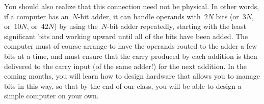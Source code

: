 You should also realize that this connection need not be physical.
In other words, if a computer has an~\mbox{$N$-bit} adder, it can
handle operands with~$2N$ bits (or~$3N$, or~$10N$, or~$42N$) by
using the~\mbox{$N$-bit} adder repeatedly, starting with the
least significant bits and working upward until all of the bits
have been added.  The computer must of course arrange to have the
operands routed to the adder a few bits at a time, and must
ensure that the carry produced by each addition is then delivered to
the carry input (of the same adder!) for the next addition.
In the coming months, you will learn how to design hardware that
allows you to manage bits in this way, so that by the end of our
class, you will be able to design a simple computer on your own.

\vfill

\pagebreak

